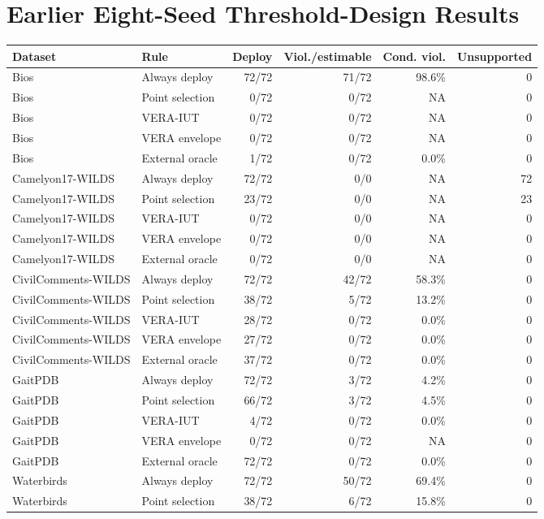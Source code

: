 \section{Earlier Eight-Seed Threshold-Design Results}
\begin{table}[!htbp]
\centering\scriptsize
\begin{tabular}{llrrrr}
\toprule
Dataset & Rule & Deploy & Viol./estimable & Cond. viol. & Unsupported \\
\midrule
Bios & Always deploy & 72/72 & 71/72 & 98.6\% & 0 \\
Bios & Point selection & 0/72 & 0/72 & NA & 0 \\
Bios & VERA-IUT & 0/72 & 0/72 & NA & 0 \\
Bios & VERA envelope & 0/72 & 0/72 & NA & 0 \\
Bios & External oracle & 1/72 & 0/72 & 0.0\% & 0 \\
\addlinespace
Camelyon17-WILDS & Always deploy & 72/72 & 0/0 & NA & 72 \\
Camelyon17-WILDS & Point selection & 23/72 & 0/0 & NA & 23 \\
Camelyon17-WILDS & VERA-IUT & 0/72 & 0/0 & NA & 0 \\
Camelyon17-WILDS & VERA envelope & 0/72 & 0/0 & NA & 0 \\
Camelyon17-WILDS & External oracle & 0/72 & 0/0 & NA & 0 \\
\addlinespace
CivilComments-WILDS & Always deploy & 72/72 & 42/72 & 58.3\% & 0 \\
CivilComments-WILDS & Point selection & 38/72 & 5/72 & 13.2\% & 0 \\
CivilComments-WILDS & VERA-IUT & 28/72 & 0/72 & 0.0\% & 0 \\
CivilComments-WILDS & VERA envelope & 27/72 & 0/72 & 0.0\% & 0 \\
CivilComments-WILDS & External oracle & 37/72 & 0/72 & 0.0\% & 0 \\
\addlinespace
GaitPDB & Always deploy & 72/72 & 3/72 & 4.2\% & 0 \\
GaitPDB & Point selection & 66/72 & 3/72 & 4.5\% & 0 \\
GaitPDB & VERA-IUT & 4/72 & 0/72 & 0.0\% & 0 \\
GaitPDB & VERA envelope & 0/72 & 0/72 & NA & 0 \\
GaitPDB & External oracle & 72/72 & 0/72 & 0.0\% & 0 \\
\addlinespace
Waterbirds & Always deploy & 72/72 & 50/72 & 69.4\% & 0 \\
Waterbirds & Point selection & 38/72 & 6/72 & 15.8\% & 0 \\

\end{tabular}
\end{table}
